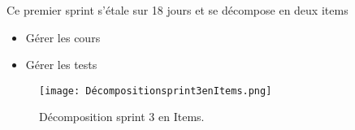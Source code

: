 \begin{fquote}
Ce premier sprint s’étale sur 18 jours et se décompose en deux items
\end{fquote}
\smallskip
\begin{itemize}[label=$\diamond$]
	\item Gérer les cours 

\item Gérer les  tests
\end{itemize}
\medskip
\medskip
\medskip
\medskip
\medskip
\medskip
\medskip
\medskip
\medskip
\medskip
\medskip
\begin{figure}[ht]
	\centering
	\texttt{[image: Décompositionsprint3enItems.png]}
	\caption{Décomposition sprint 3 en Items.}
	\label{fig:Décomposition srint 3 en Items}
\end{figure}
\FloatBarrier
\clearpage






